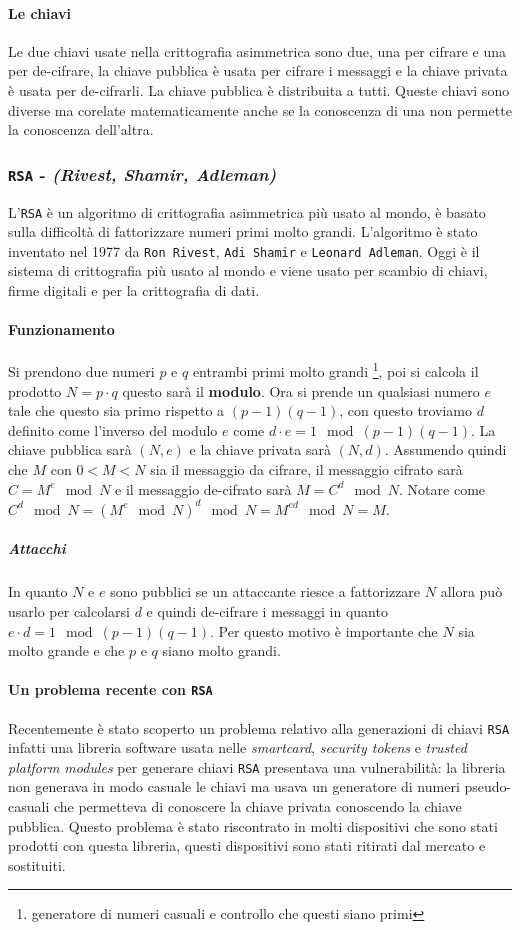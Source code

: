         \paragraph{Le chiavi} Le due chiavi usate nella crittografia asimmetrica sono due, una per cifrare e una per de-cifrare, la chiave pubblica è usata per cifrare i messaggi e la chiave privata è usata per de-cifrarli. La chiave pubblica è distribuita a tutti. Queste chiavi sono diverse ma corelate matematicamente anche se la conoscenza di una non permette la conoscenza dell'altra.
        \subsubsection{\texttt{RSA} - \textit{(Rivest, Shamir, Adleman)}}
            \label{subsubsec:RSA}
            L'\texttt{RSA} è un algoritmo di crittografia asimmetrica più usato al mondo, è basato sulla difficoltà di fattorizzare numeri primi molto grandi. L'algoritmo è stato inventato nel 1977 da \texttt{Ron Rivest}, \texttt{Adi Shamir} e \texttt{Leonard Adleman}. Oggi è il sistema di crittografia più usato al mondo e viene usato per scambio di chiavi, firme digitali e per la crittografia di dati.
            \paragraph{Funzionamento} Si prendono due numeri $ p $ e $ q $ entrambi primi molto grandi \footnote{generatore di numeri casuali e controllo che questi siano primi}, poi si calcola il prodotto $N=p\cdot q$ questo sarà il \textbf{modulo}. Ora si prende un qualsiasi numero $ e $ tale che questo sia primo rispetto a $ (p-1)(q-1) $, con questo troviamo $ d $ definito come l'inverso del modulo $ e $ come $ d\cdot e = 1 \mod (p-1)(q-1) $. La chiave pubblica sarà $ (N,e) $ e la chiave privata sarà $ (N,d) $. Assumendo quindi che $ M $ con $ 0 < M < N $ sia il messaggio da cifrare, il messaggio cifrato sarà $ C = M^e \mod N $ e il messaggio de-cifrato sarà $ M = C^d \mod N $. Notare come $ C^d \mod N = (M^e \mod N)^d \mod N = M^{ed} \mod N = M $.
            \subparagraph{Attacchi} In quanto $ N $ e $ e $ sono pubblici se un attaccante riesce a fattorizzare $ N $ allora può usarlo per calcolarsi $ d $ e quindi de-cifrare i messaggi in quanto $ e\cdot d = 1 \mod (p-1)(q-1) $. Per questo motivo è importante che $ N $ sia molto grande e che $ p $ e $ q $ siano molto grandi. 
            \paragraph{Un problema recente con \texttt{RSA}} Recentemente è stato scoperto un problema relativo alla generazioni di chiavi \texttt{RSA} infatti una libreria software usata nelle \textit{smartcard}, \textit{security tokens} e \textit{trusted platform modules} per generare chiavi \texttt{RSA} presentava una vulnerabilità: la libreria non generava in modo casuale le chiavi ma usava un generatore di numeri pseudo-casuali che permetteva di conoscere la chiave privata conoscendo la chiave pubblica. Questo problema è stato riscontrato in molti dispositivi che sono stati prodotti con questa libreria, questi dispositivi sono stati ritirati dal mercato e sostituiti.
